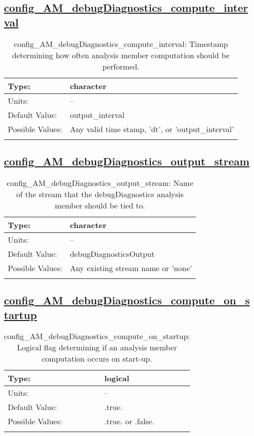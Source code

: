 \subsection[config\_AM\_debugDiagnostics\_compute\_interval]{\hyperref[sec:nm_tab_AM_debugDiagnostics]{config\_AM\_debugDiagnostics\_compute\_interval}}
\label{subsec:nm_sec_config_AM_debugDiagnostics_compute_interval}
\begin{center}
\begin{longtable}{| p{2.0in} || p{4.0in} |}
    \hline
    Type: & character \\
    \hline
    Units: & -- \\
    \hline
    Default Value: & output\_interval \\
    \hline
    Possible Values: & Any valid time stamp, 'dt', or 'output\_interval' \\
    \hline
    \caption{config\_AM\_debugDiagnostics\_compute\_interval: Timestamp determining how often analysis member computation should be performed.}
\end{longtable}
\end{center}
\subsection[config\_AM\_debugDiagnostics\_output\_stream]{\hyperref[sec:nm_tab_AM_debugDiagnostics]{config\_AM\_debugDiagnostics\_output\_stream}}
\label{subsec:nm_sec_config_AM_debugDiagnostics_output_stream}
\begin{center}
\begin{longtable}{| p{2.0in} || p{4.0in} |}
    \hline
    Type: & character \\
    \hline
    Units: & -- \\
    \hline
    Default Value: & debugDiagnosticsOutput \\
    \hline
    Possible Values: & Any existing stream name or 'none' \\
    \hline
    \caption{config\_AM\_debugDiagnostics\_output\_stream: Name of the stream that the debugDiagnostics analysis member should be tied to.}
\end{longtable}
\end{center}
\subsection[config\_AM\_debugDiagnostics\_compute\_on\_startup]{\hyperref[sec:nm_tab_AM_debugDiagnostics]{config\_AM\_debugDiagnostics\_compute\_on\_startup}}
\label{subsec:nm_sec_config_AM_debugDiagnostics_compute_on_startup}
\begin{center}
\begin{longtable}{| p{2.0in} || p{4.0in} |}
    \hline
    Type: & logical \\
    \hline
    Units: & -- \\
    \hline
    Default Value: & .true. \\
    \hline
    Possible Values: & .true. or .false. \\
    \hline
    \caption{config\_AM\_debugDiagnostics\_compute\_on\_startup: Logical flag determining if an analysis member computation occurs on start-up.}
\end{longtable}
\end{center}
